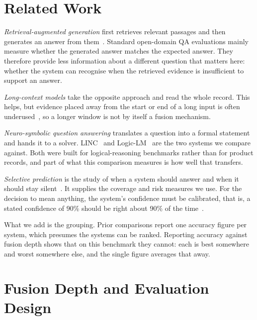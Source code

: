 \documentclass[conference]{IEEEtran}
\begin{document}
\section{Related Work}
\textit{Retrieval-augmented generation} first retrieves relevant passages and
then generates an answer from them~\cite{lewis2020rag,izacard2021passage}.
Standard open-domain QA evaluations mainly measure whether the generated answer
matches the expected answer. They therefore provide less information about a
different question that matters here: whether the system can recognise when the
retrieved evidence is insufficient to support an answer.

\textit{Long-context models} take the opposite approach and read the whole
record. This helps, but evidence placed away from the start or end of a long
input is often underused~\cite{liu2024lost}, so a longer window is not by itself
a fusion mechanism.

\textit{Neuro-symbolic question answering} translates a question into a formal
statement and hands it to a solver. LINC~\cite{olausson2023linc} and
Logic-LM~\cite{pan2023logiclm} are the two systems we compare against. Both were
built for logical-reasoning benchmarks rather than for product records, and part
of what this comparison measures is how well that transfers.

\textit{Selective prediction} is the study of when a system should answer and
when it should stay silent~\cite{elyaniv2010foundations}. It supplies the
coverage and risk measures we use. For the decision to mean anything, the
system's confidence must be calibrated, that is, a stated confidence of 90\%
should be right about 90\% of the time~\cite{guo2017calibration}.

What we add is the grouping. Prior comparisons report one accuracy figure per
system, which presumes the systems can be ranked. Reporting accuracy against
fusion depth shows that on this benchmark they cannot: each is best somewhere
and worst somewhere else, and the single figure averages that away.

\section{Fusion Depth and Evaluation Design}
\end{document}
